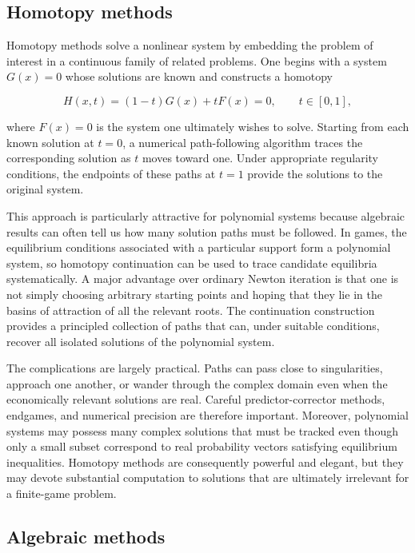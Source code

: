 \documentclass[11pt]{article}
\begin{document}
\subsection{Homotopy methods}\label{homotopy-methods}

Homotopy methods solve a nonlinear system by embedding the problem of
interest in a continuous family of related problems. One begins with a
system \(G(x)=0\) whose solutions are known and constructs a homotopy

\[
H(x,t)=(1-t)G(x)+tF(x)=0,
\qquad t\in[0,1],
\]

where \(F(x)=0\) is the system one ultimately wishes to solve. Starting
from each known solution at \(t=0\), a numerical path-following
algorithm traces the corresponding solution as \(t\) moves toward one.
Under appropriate regularity conditions, the endpoints of these paths at
\(t=1\) provide the solutions to the original system.

This approach is particularly attractive for polynomial systems because
algebraic results can often tell us how many solution paths must be
followed. In games, the equilibrium conditions associated with a
particular support form a polynomial system, so homotopy continuation
can be used to trace candidate equilibria systematically. A major
advantage over ordinary Newton iteration is that one is not simply
choosing arbitrary starting points and hoping that they lie in the
basins of attraction of all the relevant roots. The continuation
construction provides a principled collection of paths that can, under
suitable conditions, recover all isolated solutions of the polynomial
system.

The complications are largely practical. Paths can pass close to
singularities, approach one another, or wander through the complex
domain even when the economically relevant solutions are real. Careful
predictor-corrector methods, endgames, and numerical precision are
therefore important. Moreover, polynomial systems may possess many
complex solutions that must be tracked even though only a small subset
correspond to real probability vectors satisfying equilibrium
inequalities. Homotopy methods are consequently powerful and elegant,
but they may devote substantial computation to solutions that are
ultimately irrelevant for a finite-game problem.

\subsection{Algebraic methods}\label{algebraic-methods}
\end{document}
